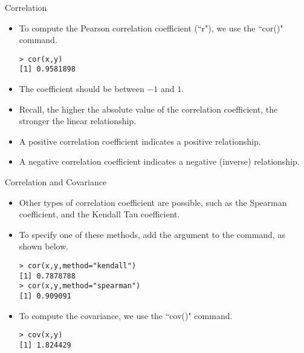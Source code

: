 \documentclass[pdf,default,slideColor,colorBG]{prosper}
\begin{document}



\begin{slide}{Correlation}
\begin{itemize}
\item To compute the Pearson correlation coefficient (``r"), we use the ``cor()" command.
\begin{verbatim}
> cor(x,y)
[1] 0.9581898
\end{verbatim}
\item The coefficient should be between $-1$ and $1$.
\item Recall, the higher the absolute value of the correlation coefficient, the stronger the linear relationship.
\item A positive correlation coefficient indicates a positive relationship.
\item A negative correlation coefficient indicates a negative (inverse) relationship.
\end{itemize}
\end{slide}

\begin{slide}{Correlation and Covariance}
\begin{itemize}
\item Other types of correlation coefficient are possible, such as the Spearman coefficient, and the Kendall Tau coefficient.
\item To specify one of these methods, add the argument to the command, as shown below.
 \begin{verbatim}
> cor(x,y,method="kendall")
[1] 0.7878788
> cor(x,y,method="spearman")
[1] 0.909091
\end{verbatim}

\item To compute the covariance, we use the ``cov()" command.
\begin{verbatim}
> cov(x,y)
[1] 1.824429
\end{verbatim}

\end{itemize}
\end{slide}
\end{document}
